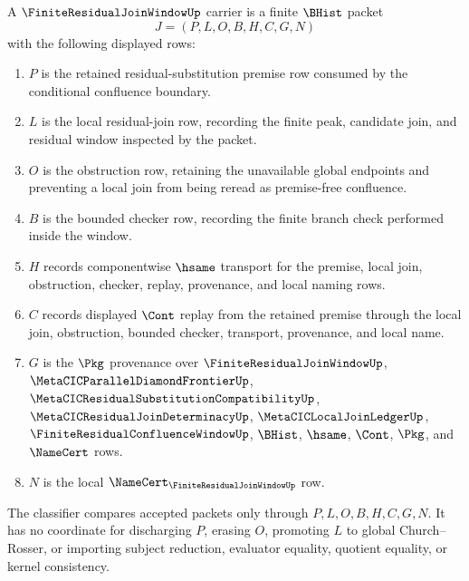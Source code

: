 \begin{definition}
\label{def:finite-residual-join-window-carrier}
A $\FiniteResidualJoinWindowUp$ carrier is a finite $\BHist$ packet
$$
J=(P,L,O,B,H,C,G,N)
$$
with the following displayed rows:
\begin{enumerate}
\item $P$ is the retained residual-substitution premise row consumed by the conditional confluence boundary.
\item $L$ is the local residual-join row, recording the finite peak, candidate join, and residual window inspected by the packet.
\item $O$ is the obstruction row, retaining the unavailable global endpoints and preventing a local join from being reread as premise-free confluence.
\item $B$ is the bounded checker row, recording the finite branch check performed inside the window.
\item $H$ records componentwise $\hsame$ transport for the premise, local join, obstruction, checker, replay, provenance, and local naming rows.
\item $C$ records displayed $\Cont$ replay from the retained premise through the local join, obstruction, bounded checker, transport, provenance, and local name.
\item $G$ is the $\Pkg$ provenance over $\FiniteResidualJoinWindowUp$, $\MetaCICParallelDiamondFrontierUp$, $\MetaCICResidualSubstitutionCompatibilityUp$, $\MetaCICResidualJoinDeterminacyUp$, $\MetaCICLocalJoinLedgerUp$, $\FiniteResidualConfluenceWindowUp$, $\BHist$, $\hsame$, $\Cont$, $\Pkg$, and $\NameCert$ rows.
\item $N$ is the local $\NameCert_{\FiniteResidualJoinWindowUp}$ row.
\end{enumerate}
The classifier compares accepted packets only through $P,L,O,B,H,C,G,N$. It has no coordinate for discharging $P$, erasing $O$, promoting $L$ to global Church--Rosser, or importing subject reduction, evaluator equality, quotient equality, or kernel consistency.
\end{definition}

